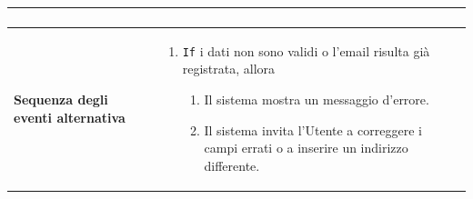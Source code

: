 \documentclass[a4paper]{report}
\begin{document}
\begin{table}[H]
\begin{tabular}{|p{3.9cm}|p{9.9cm}|}
\begin{enumerate}[leftmargin=14pt,label=\arabic*.,labelsep=0.5em,topsep=0pt,partopsep=0pt,parsep=0pt,itemsep=0pt]
\end{enumerate} \\ \hline
\textbf{Sequenza degli eventi alternativa} & \begin{enumerate}[leftmargin=14pt,label=\arabic*.,labelsep=0.5em,topsep=0pt,partopsep=0pt,parsep=0pt,itemsep=0pt]
   \item \texttt{If} i dati non sono validi o l'email risulta già registrata, allora
   \begin{enumerate}[label=\arabic{enumi}.\arabic*.,leftmargin=22pt,labelsep=0.5em,topsep=0pt,partopsep=0pt,parsep=0pt,itemsep=0pt]
       \item Il sistema mostra un messaggio d'errore.
       \item Il sistema invita l'Utente a correggere i campi errati o a inserire un indirizzo differente.
   \end{enumerate}
\end{enumerate}\\ \hline
\end{tabular}
\end{table}
\end{document}
